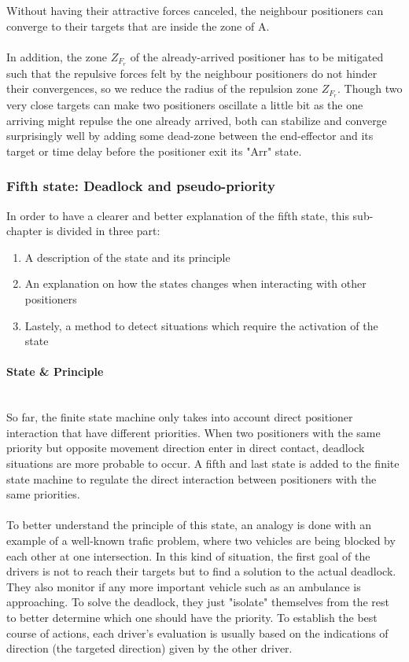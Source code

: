 \documentclass[]{spie}  %
\begin{document}
	Without having their attractive forces canceled, the neighbour positioners can converge to their targets that are inside the zone of A.\\\\
	In addition, the zone $Z_{F_{r}}$ of the already-arrived positioner has to be mitigated such that the repulsive forces felt by the neighbour positioners do not hinder their convergences, so we reduce the radius of the repulsion zone $Z_{F_{r}}$. Though two very close targets can make two positioners oscillate a little bit as the one arriving might repulse the one already arrived, both can stabilize and converge surprisingly well by adding some dead-zone between the end-effector and its target or time delay before the positioner exit its "Arr" state.  
	
	\subsubsection{Fifth state: Deadlock and pseudo-priority}
	\label{sub_chapter_fifth_state}
	In order to have a clearer and better explanation of the fifth state, this sub-chapter is divided in three part: 
	\begin{enumerate}
		\item A description of the state and its principle 
		\item An explanation on how the states changes when interacting with other positioners
		\item Lastely, a method to detect situations which require the activation of the state
	\end{enumerate}
	
	\paragraph{State \& Principle}\mbox{}\\
	So far, the finite state machine only takes into account direct positioner interaction that have different priorities.
	When two positioners with the same priority but opposite movement direction enter in direct contact, deadlock situations are more probable to occur. A fifth and last state is added to the finite state machine to regulate the direct interaction between positioners with the same priorities.\\\\	
	To better understand the principle of this state, an analogy is done with an example of a well-known trafic problem, where two vehicles are being blocked by each other at one intersection. 
	In this kind of situation, the first goal of the drivers is not to reach their targets but to find a solution to the actual deadlock. They also monitor if any more important vehicle such as an ambulance is approaching. To solve the deadlock, they just "isolate" themselves from the rest to better determine which one should have the priority. To establish the best course of actions, each driver's evaluation is usually based on the indications of direction (the targeted direction) given by the other driver.\\
	
\end{document}
